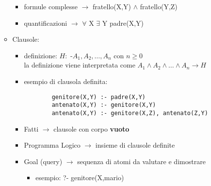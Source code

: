 \documentclass[12pt]{extarticle}
\begin{document}
\begin{itemize}
\begin{itemize}
\begin{itemize}
      \item formule complesse $\rightarrow$ fratello(X,Y) $\wedge$ fratello(Y,Z) 
      \item quantificazioni $\rightarrow$ $\forall$ X $\exists$ Y padre(X,Y)
    \end{itemize}
    \item  Clausole:
    \begin{itemize}
      \item definizione: $H:$ -$ A_1, A_2, \dots, A_n$ con $n \ge 0$ 
            \\ la definizione viene interpretata come $A_1 \wedge A_2 \wedge \dots \wedge A_n \rightarrow H$
      \item esempio di clausola definita:
      \begin{lstlisting}
        genitore(X,Y) :- padre(X,Y)
        antenato(X,Y) :- genitore(X,Y)
        antenato(X,Y) :- genitore(X,Z), antenato(Z,Y)
      \end{lstlisting}
      \item Fatti $\rightarrow$ clausole con corpo \textbf{vuoto}
      \item Programma Logico $\rightarrow$ insieme di clausole definite
      \item Goal (query) $\rightarrow$ sequenza di atomi da valutare e dimostrare
      \begin{itemize}
        \item esempio: ?- genitore(X,mario)
      \end{itemize}
    \end{itemize}
  \end{itemize}
\end{itemize}

\newpage
\end{document}
